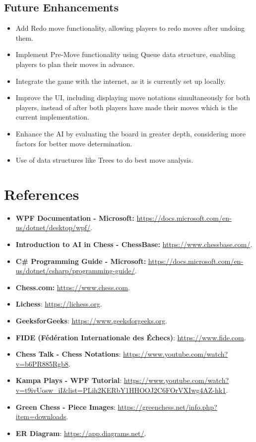 \documentclass[a4paper,12pt]{article}
\begin{document}
\subsection{Future Enhancements}
\begin{itemize}
    \item Add Redo move functionality, allowing players to redo moves after undoing them.
    \item Implement Pre-Move functionality using Queue data structure, enabling players to plan their moves in advance.
    \item Integrate the game with the internet, as it is currently set up locally.
    \item Improve the UI, including displaying move notations simultaneously for both players, instead of after both players have made their moves which is the current implementation.
    \item Enhance the AI by evaluating the board in greater depth, considering more factors for better move determination.
    \item Use of data structures like Trees to do best move analysis.
\end{itemize}

\section{References}
\begin{itemize}
    \item \textbf{WPF Documentation - Microsoft:} \url{https://docs.microsoft.com/en-us/dotnet/desktop/wpf/}.
    \item \textbf{Introduction to AI in Chess - ChessBase:} \url{https://www.chessbase.com/}.
    \item \textbf{C\# Programming Guide - Microsoft:} \url{https://docs.microsoft.com/en-us/dotnet/csharp/programming-guide/}.
    \item \textbf{Chess.com:} \url{https://www.chess.com}. 
    \item \textbf{Lichess}: \url{https://lichess.org}. 
    \item \textbf{GeeksforGeeks}: \url{https://www.geeksforgeeks.org}.
    \item \textbf{FIDE (Fédération Internationale des Échecs)}: \url{https://www.fide.com}.
    \item \textbf{Chess Talk - Chess Notations}: \url{https://www.youtube.com/watch?v=b6PR885Rgb8}. 
    \item \textbf{Kampa Plays - WPF Tutorial}: \url{https://www.youtube.com/watch?v=t9ivUosw_iI&list=PLih2KERbY1HHOOJ2C6FOrVXIwg4AZ-hk1}.
    \item \textbf{Green Chess - Piece Images}:  \url{https://greenchess.net/info.php?item=downloads}.
    \item \textbf{ER Diagram}:  \url{https://app.diagrams.net/}.
\end{itemize}
\end{document}
